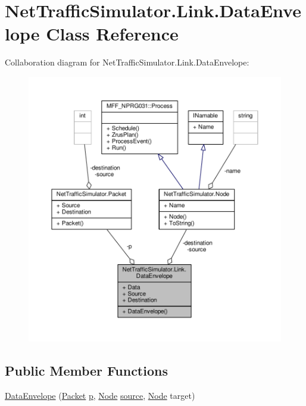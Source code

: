\hypertarget{classNetTrafficSimulator_1_1Link_1_1DataEnvelope}{\section{Net\-Traffic\-Simulator.\-Link.\-Data\-Envelope Class Reference}
\label{classNetTrafficSimulator_1_1Link_1_1DataEnvelope}
}


Collaboration diagram for Net\-Traffic\-Simulator.\-Link.\-Data\-Envelope\-:\nopagebreak
\begin{figure}[H]
\begin{center}
\leavevmode
\includegraphics[width=350pt]{classNetTrafficSimulator_1_1Link_1_1DataEnvelope__coll__graph}
\end{center}
\end{figure}
\subsection*{Public Member Functions}
\begin{DoxyCompactItemize}
\item 
\hyperlink{classNetTrafficSimulator_1_1Link_1_1DataEnvelope_aeb2a043396c63e9e27ecce740d877826}{Data\-Envelope} (\hyperlink{classNetTrafficSimulator_1_1Packet}{Packet} \hyperlink{classNetTrafficSimulator_1_1Link_1_1DataEnvelope_a3c8959eec1aeec3d016cc06c5a01a074}{p}, \hyperlink{classNetTrafficSimulator_1_1Node}{Node} \hyperlink{classNetTrafficSimulator_1_1Link_1_1DataEnvelope_a9e56896aa5da48e13e8c13cb9efc20f4}{source}, \hyperlink{classNetTrafficSimulator_1_1Node}{Node} target)
\end{DoxyCompactItemize}
